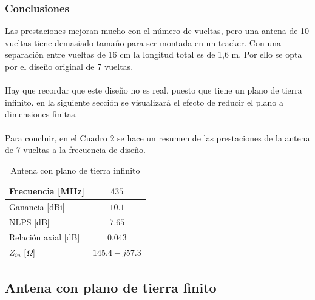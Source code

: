 \documentclass[12pt]{article}
\begin{document}
\subsubsection*{Conclusiones}
Las prestaciones mejoran mucho con el número de vueltas, pero una antena de 10 vueltas tiene demasiado tamaño para ser montada en un tracker. Con una separación entre vueltas de 16 cm la longitud total es de 1,6 m. Por ello se opta por el diseño original de 7 vueltas.\\\\
Hay que recordar que este diseño no es real, puesto que tiene un plano de tierra infinito. en la siguiente sección se visualizará el efecto de reducir el plano a dimensiones finitas.\\\\
Para concluir, en el Cuadro 2 se hace un resumen de las prestaciones de la antena de 7 vueltas a la frecuencia de diseño.\\

\begin{table}[!h]
	\centering
\begin{tabular}{lc}
	\hline 
	Frecuencia [MHz] & $435$ \\ 
	\hline 
	Ganancia [dBi] & $10.1$ \\ 
	\hline 
	NLPS [dB] & $7.65$ \\ 
	\hline 
	Relación axial [dB] & $0.043$ \\ 
	\hline 
	$Z_{in}$ [$\Omega$] & $145.4 - j57.3$ \\ 
	\hline 
\end{tabular} 
\caption{Antena con plano de tierra infinito}
\end{table} 
\newpage

\subsection{Antena con plano de tierra finito}

%
\end{document}
